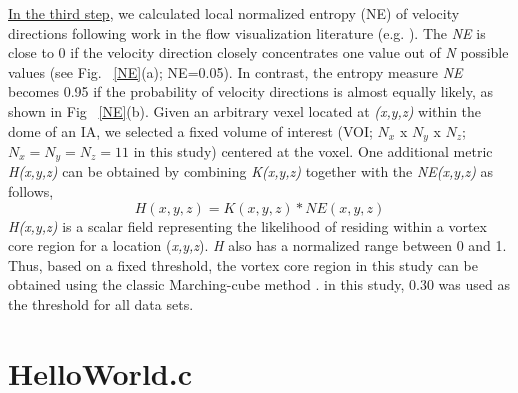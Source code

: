 \underline{In the third step}, we calculated local normalized entropy (NE) of velocity directions \cite{shannon2001mathematical} following work in the flow visualization literature (e.g. \cite{xu2010information,ma2014graph}). The \textit{NE} is close to 0 if the velocity direction closely concentrates one value out of \textit{N} possible values (see Fig. ~\ref{NE}(a); NE=0.05). In contrast, the entropy measure \textit{NE} becomes 0.95 if the probability of velocity directions is almost equally likely, as shown in Fig ~\ref{NE}(b). Given an arbitrary vexel located at \textit{(x,y,z)} within the dome of an IA, we selected a fixed volume of interest (VOI; $N_x$ x $N_y$ x $N_z$; $N_x=N_y=N_z=11$ in this study) centered at the voxel. One additional metric \textit{H(x,y,z)} can be obtained by combining \textit{K(x,y,z)} together with the \textit{NE(x,y,z)} as follows,
	\begin{equation}
	H(x,y,z) = K(x,y,z) * NE(x,y,z)
	\end{equation}
\textit{H(x,y,z)} is a scalar field representing the likelihood of residing within a vortex core region for a location (\textit{x,y,z}). \textit{H} also has a normalized range between 0 and 1. Thus, based on a fixed threshold, the vortex core region in this study can be obtained using the classic Marching-cube method \cite{lorensen1987marching}. in this study, 0.30 was used as the threshold for all data sets.

\section{HelloWorld.c}\label{APPENDIXB_SECTION1}
\renewcommand{\baselinestretch}{1.25}
\lstset{
  language=c
}

\renewcommand{\baselinestretch}{\lineheight}
